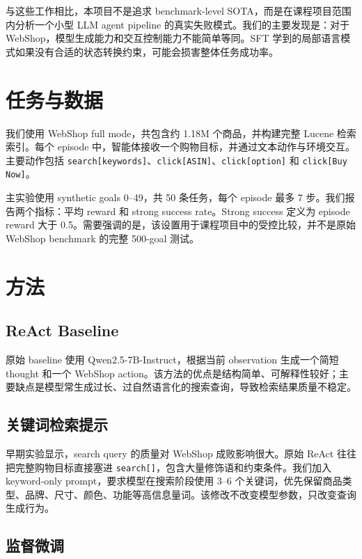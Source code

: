 \documentclass[11pt]{article}
\begin{document}
与这些工作相比，本项目不是追求 benchmark-level SOTA，而是在课程项目范围内分析一个小型 LLM agent pipeline 的真实失败模式。我们的主要发现是：对于 WebShop，模型生成能力和交互控制能力不能简单等同。SFT 学到的局部语言模式如果没有合适的状态转换约束，可能会损害整体任务成功率。

\section{任务与数据}

我们使用 WebShop full mode，共包含约 1.18M 个商品，并构建完整 Lucene 检索索引。每个 episode 中，智能体接收一个购物目标，并通过文本动作与环境交互。主要动作包括 \texttt{search[keywords]}、\texttt{click[ASIN]}、\texttt{click[option]} 和 \texttt{click[Buy Now]}。

主实验使用 synthetic goals 0--49，共 50 条任务，每个 episode 最多 7 步。我们报告两个指标：平均 reward 和 strong success rate。Strong success 定义为 episode reward 大于 0.5。需要强调的是，该设置用于课程项目中的受控比较，并不是原始 WebShop benchmark 的完整 500-goal 测试。

\section{方法}

\subsection{ReAct Baseline}

原始 baseline 使用 Qwen2.5-7B-Instruct，根据当前 observation 生成一个简短 thought 和一个 WebShop action。该方法的优点是结构简单、可解释性较好；主要缺点是模型常生成过长、过自然语言化的搜索查询，导致检索结果质量不稳定。

\subsection{关键词检索提示}

早期实验显示，search query 的质量对 WebShop 成败影响很大。原始 ReAct 往往把完整购物目标直接塞进 \texttt{search[]}，包含大量修饰语和约束条件。我们加入 keyword-only prompt，要求模型在搜索阶段使用 3--6 个关键词，优先保留商品类型、品牌、尺寸、颜色、功能等高信息量词。该修改不改变模型参数，只改变查询生成行为。

\subsection{监督微调}
\end{document}
